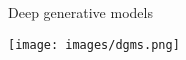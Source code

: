     

\begin{frame}{Deep generative models}
    
    \begin{center}
        \vspace{-.5em}
        \texttt{[image: images/dgms.png]}
        \vspace{.5em}
    \end{center}
   
\end{frame}
    



    
    
    
    
